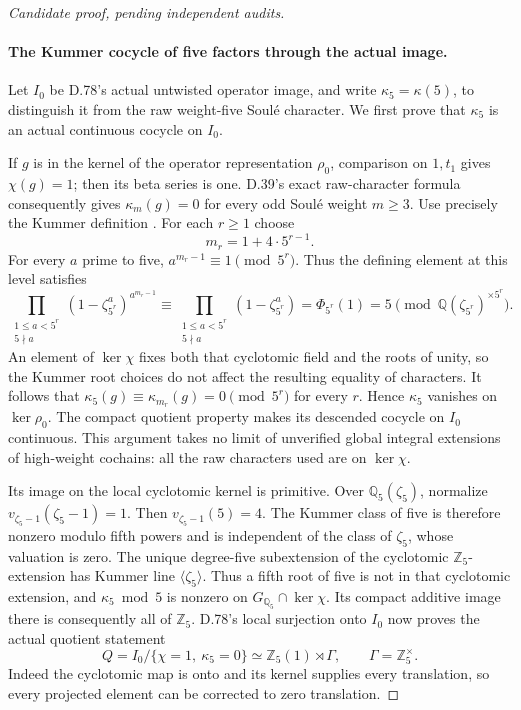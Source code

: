 \begin{proof}[Candidate proof, pending independent audits]
\paragraph{The Kummer cocycle of five factors through the actual image.}
Let \(I_0\) be D.78's actual untwisted operator image, and
write \(\kappa_5=\kappa(5)\), to distinguish it from the raw
weight-five Soul\'e character. We first prove that \(\kappa_5\)
is an actual continuous cocycle on \(I_0\).

If \(g\) is in the kernel of the operator representation
\(\rho_0\), comparison on \(1,t_1\) gives \(\chi(g)=1\);
then its beta series is one. D.39's exact raw-character
formula consequently gives
\(\kappa_m(g)=0\) for every odd Soul\'e weight \(m\ge3\).
Use precisely the Kummer definition
\cite[(1.1)--(1.2)]{DE_NakamuraSakugawaWojtkowiak2017}.
For each \(r\ge1\) choose
\[
                 m_r=1+4\cdot5^{r-1}.
                                                               \tag{D.82.5}
\]
For every \(a\) prime to five, \(a^{m_r-1}\equiv1\pmod{5^r}\).
Thus the defining element at this level satisfies
\[
 \prod_{\substack{1\le a<5^r\\5\nmid a}}
      (1-\zeta_{5^r}^{a})^{a^{m_r-1}}
       \equiv
 \prod_{\substack{1\le a<5^r\\5\nmid a}}
      (1-\zeta_{5^r}^{a})
       =\Phi_{5^r}(1)=5
       \pmod{\mathbb Q(\zeta_{5^r})^{\times 5^r}}.
                                                               \tag{D.82.6}
\]
An element of \(\ker\chi\) fixes both that cyclotomic field
and the roots of unity, so the Kummer root choices do not
affect the resulting equality of characters.
It follows that
\(\kappa_5(g)\equiv\kappa_{m_r}(g)=0\pmod{5^r}\) for every \(r\).
Hence \(\kappa_5\) vanishes on \(\ker\rho_0\).
The compact quotient property makes its descended cocycle
on \(I_0\) continuous. This argument takes no limit of
unverified global integral extensions of high-weight cochains:
all the raw characters used are on \(\ker\chi\).

Its image on the local cyclotomic kernel is primitive.
Over \(\mathbb Q_5(\zeta_5)\), normalize
\(v_{\zeta_5-1}(\zeta_5-1)=1\). Then \(v_{\zeta_5-1}(5)=4\).
The Kummer class of five is therefore nonzero modulo fifth
powers and is independent of the class of \(\zeta_5\), whose
valuation is zero. The unique degree-five subextension of
the cyclotomic \(\mathbb Z_5\)-extension has Kummer line
\(\langle\zeta_5\rangle\). Thus a fifth root of five is not
in that cyclotomic extension, and \(\kappa_5\bmod5\) is nonzero
on \(G_{\mathbb Q_5}\cap\ker\chi\). Its compact additive image
there is consequently all of \(\mathbb Z_5\).
D.78's local surjection onto \(I_0\) now proves the actual
quotient statement
\[
 Q=I_0/\{\chi=1,\ \kappa_5=0\}
       \simeq\mathbb Z_5(1)\rtimes\Gamma,\qquad
                  \Gamma=\mathbb Z_5^\times .
                                                               \tag{D.82.7}
\]
Indeed the cyclotomic map is onto and its kernel supplies
every translation, so every projected element can be
corrected to zero translation.


\end{proof}
